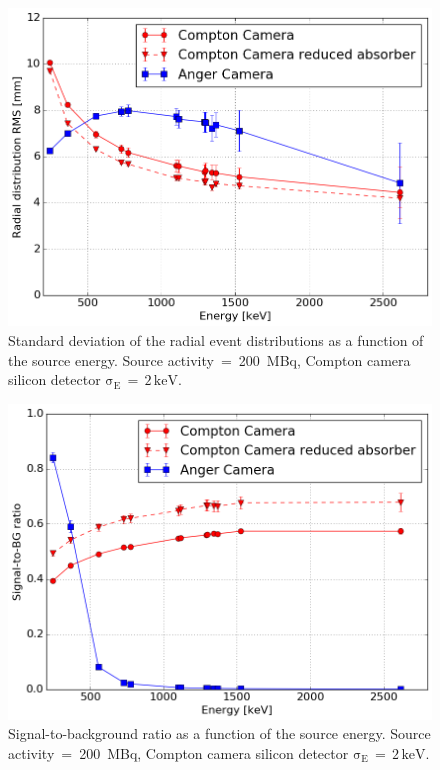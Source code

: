 \begin{figure}[h!]
\begin{center}
\includegraphics[scale=0.4]{03_GraphicFiles/chapter5_SPECTsimu/SPECT/comparison/reduced_absorber/RMSVSenergy_overlap}
\caption{Standard deviation of the radial event distributions as a function of the source energy. Source activity~=~200~MBq, Compton camera silicon detector $\mathrm{\sigma_{E}\,=\,2\,keV}$.}
\label{chap5::fig::RMS_energy_comp}
\end{center}
\end{figure}

\begin{figure}[h!]
\begin{center}
\includegraphics[scale=0.4]{03_GraphicFiles/chapter5_SPECTsimu/SPECT/comparison/reduced_absorber/SOBVSenergy_overlap}
\caption{Signal-to-background ratio as a function of the source energy. Source activity~=~200~MBq, Compton camera silicon detector $\mathrm{\sigma_{E}\,=\,2\,keV}$.}
\label{chap5::fig::sel_eff_energy_comp}
\end{center}
\end{figure}

